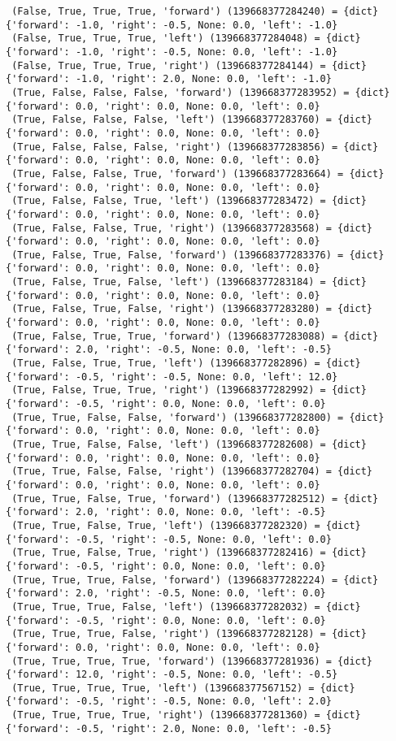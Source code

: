 \documentclass[12pt]{article}
\begin{document}
{\begin{verbatim}
 (False, True, True, True, 'forward') (139668377284240) = {dict} {'forward': -1.0, 'right': -0.5, None: 0.0, 'left': -1.0}
 (False, True, True, True, 'left') (139668377284048) = {dict} {'forward': -1.0, 'right': -0.5, None: 0.0, 'left': -1.0}
 (False, True, True, True, 'right') (139668377284144) = {dict} {'forward': -1.0, 'right': 2.0, None: 0.0, 'left': -1.0}
 (True, False, False, False, 'forward') (139668377283952) = {dict} {'forward': 0.0, 'right': 0.0, None: 0.0, 'left': 0.0}
 (True, False, False, False, 'left') (139668377283760) = {dict} {'forward': 0.0, 'right': 0.0, None: 0.0, 'left': 0.0}
 (True, False, False, False, 'right') (139668377283856) = {dict} {'forward': 0.0, 'right': 0.0, None: 0.0, 'left': 0.0}
 (True, False, False, True, 'forward') (139668377283664) = {dict} {'forward': 0.0, 'right': 0.0, None: 0.0, 'left': 0.0}
 (True, False, False, True, 'left') (139668377283472) = {dict} {'forward': 0.0, 'right': 0.0, None: 0.0, 'left': 0.0}
 (True, False, False, True, 'right') (139668377283568) = {dict} {'forward': 0.0, 'right': 0.0, None: 0.0, 'left': 0.0}
 (True, False, True, False, 'forward') (139668377283376) = {dict} {'forward': 0.0, 'right': 0.0, None: 0.0, 'left': 0.0}
 (True, False, True, False, 'left') (139668377283184) = {dict} {'forward': 0.0, 'right': 0.0, None: 0.0, 'left': 0.0}
 (True, False, True, False, 'right') (139668377283280) = {dict} {'forward': 0.0, 'right': 0.0, None: 0.0, 'left': 0.0}
 (True, False, True, True, 'forward') (139668377283088) = {dict} {'forward': 2.0, 'right': -0.5, None: 0.0, 'left': -0.5}
 (True, False, True, True, 'left') (139668377282896) = {dict} {'forward': -0.5, 'right': -0.5, None: 0.0, 'left': 12.0}
 (True, False, True, True, 'right') (139668377282992) = {dict} {'forward': -0.5, 'right': 0.0, None: 0.0, 'left': 0.0}
 (True, True, False, False, 'forward') (139668377282800) = {dict} {'forward': 0.0, 'right': 0.0, None: 0.0, 'left': 0.0}
 (True, True, False, False, 'left') (139668377282608) = {dict} {'forward': 0.0, 'right': 0.0, None: 0.0, 'left': 0.0}
 (True, True, False, False, 'right') (139668377282704) = {dict} {'forward': 0.0, 'right': 0.0, None: 0.0, 'left': 0.0}
 (True, True, False, True, 'forward') (139668377282512) = {dict} {'forward': 2.0, 'right': 0.0, None: 0.0, 'left': -0.5}
 (True, True, False, True, 'left') (139668377282320) = {dict} {'forward': -0.5, 'right': -0.5, None: 0.0, 'left': 0.0}
 (True, True, False, True, 'right') (139668377282416) = {dict} {'forward': -0.5, 'right': 0.0, None: 0.0, 'left': 0.0}
 (True, True, True, False, 'forward') (139668377282224) = {dict} {'forward': 2.0, 'right': -0.5, None: 0.0, 'left': 0.0}
 (True, True, True, False, 'left') (139668377282032) = {dict} {'forward': -0.5, 'right': 0.0, None: 0.0, 'left': 0.0}
 (True, True, True, False, 'right') (139668377282128) = {dict} {'forward': 0.0, 'right': 0.0, None: 0.0, 'left': 0.0}
 (True, True, True, True, 'forward') (139668377281936) = {dict} {'forward': 12.0, 'right': -0.5, None: 0.0, 'left': -0.5}
 (True, True, True, True, 'left') (139668377567152) = {dict} {'forward': -0.5, 'right': -0.5, None: 0.0, 'left': 2.0}
 (True, True, True, True, 'right') (139668377281360) = {dict} {'forward': -0.5, 'right': 2.0, None: 0.0, 'left': -0.5}
\end{verbatim}
}
\end{document}
